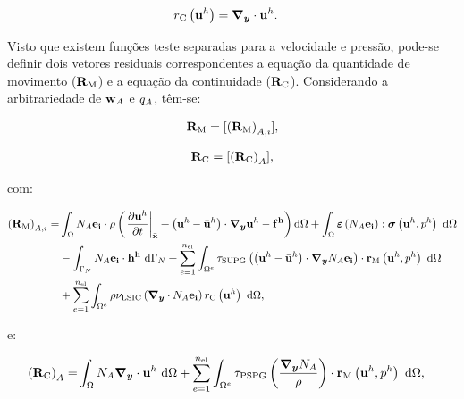 \documentclass[tese_patricia]{subfiles}%
\begin{document}
\noindent

\begin{align}
{r}_{\mathrm{C}}\left(\mathbf{u}^h\right)&=\boldsymbol{\nabla_y} \cdot \mathbf{u}^h.
\end{align}

Visto que existem funções teste separadas para a velocidade e pressão, pode-se definir dois vetores residuais correspondentes a equação da quantidade de movimento ($\mathbf{R}_\mathrm{M}$) e a equação da continuidade ($\mathbf{R}_\mathrm{C}$). Considerando a arbitrariedade de $\mathbf{w}_{A}$ e $q_{A}$, têm-se:

\begin{align}
\mathbf{R}_\mathrm{M}  = [\left(\mathbf{R}_\mathrm{M}\right)_{A,i}],
\end{align}

\begin{align}
\mathbf{R}_\mathrm{C} =  [\left(\mathbf{R}_\mathrm{C}\right)_{A}],
\end{align}
	
\noindent com:

\begin{align}
	\begin{split}
	\left(\NNSM\right)_{A,i} =&\int_{\domain} \shapef_{A}\mathbf{e_i} \cdot \density\left(\left. \frac{\partial\velocityh}{\partial t}\right|_{\posALE}+\left(\velocityh - \velocityALEh \right)\cdot \gradient \velocityh - \sbodyforceh\right) \deriv \domain +\int_{\domain} \straintensor \left(\shapef_{A}\mathbf{e_i}\right) : \stressTensor \left(\velocityh,\pressh\right)\ \deriv \domain\\ &
	- \int_{\boundaryN}\shapef_{A}\mathbf{e_i} \cdot \surfaceLoadh \ \deriv \boundaryN 
	+ \sum_{e=1}^{\nel} \int_{\domainE} \SUPG \left(\left(\velocityh - \velocityALEh \right) \cdot \gradient \shapef_{A}\mathbf{e_i}\right) \cdot \resMom\left(\velocityh,\pressh \right)\  \deriv \domain\\
	&+ \sum_{e=1}^{\nel} \int_{\domainE} \density \LSIC \left(\divergence \cdot \shapef_{A}\mathbf{e_i}\right) \resPre\left(\velocityh\right)\  \deriv \domain  ,
	\end{split}
\end{align}

\noindent e:

\begin{align}
	\begin{split}
	\left(\mathbf{R}_\mathrm{C}\right)_{A} = &\int_{\Omega} N_{A} \boldsymbol{\nabla_y} \cdot \mathbf{u}^h \ \mathrm{d} \Omega  
	+ \sum_{e=1}^{n_{\mathrm{el}}} \int_{\Omega^e} \tau_{\mathrm{PSPG}} \left(\frac{\boldsymbol{\nabla_y} N_{A}}{\rho}\right) \cdot \mathbf{r}_{\mathrm{M}}\left(\mathbf{u}^h,p^h\right) \  \mathrm{d} \Omega,
	\end{split}
\end{align}
\end{document}
